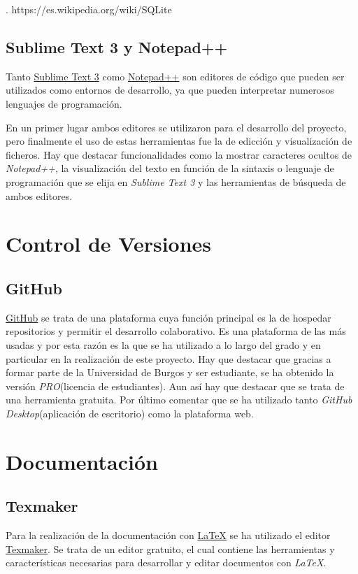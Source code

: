 \cite{sqlite}. https://es.wikipedia.org/wiki/SQLite

\subsection{Sublime Text 3 y Notepad++}\label{sublime_text_3_y_notepad++}
Tanto \href{https://www.sublimetext.com/}{Sublime Text 3} como \href{https://notepad-plus-plus.org/}{Notepad++} son editores de código que pueden ser utilizados como entornos de desarrollo, ya que pueden interpretar numerosos lenguajes de programación. 

En un primer lugar ambos editores se utilizaron para el desarrollo del proyecto, pero finalmente el uso de estas herramientas fue la de edicción y visualización de ficheros. Hay que destacar funcionalidades como la mostrar caracteres ocultos de \emph{Notepad++}, la visualización del texto en función de la sintaxis o lenguaje de programación que se elija en \emph{Sublime Text 3} y las herramientas de búsqueda de ambos editores.


\section{Control de Versiones}\label{control_de_versiones}
\subsection{GitHub}\label{gitHub}
\href{https://github.com/}{GitHub} se trata de una plataforma cuya función principal es la de hospedar repositorios y permitir el desarrollo colaborativo.
Es una plataforma de las más usadas y por esta razón es la que se ha utilizado a lo largo del grado y en particular en la realización de este proyecto. Hay que destacar que gracias a formar parte de la Universidad de Burgos y ser estudiante, se ha obtenido la versión \emph{PRO}(licencia de estudiantes). Aun así hay que destacar que se trata de una herramienta gratuita.
Por último comentar que se ha utilizado tanto \emph{GitHub Desktop}(aplicación de escritorio) como la plataforma web.

\cite{github}


\section{Documentación}\label{documentacion}

\subsection{Texmaker}\label{texmaker}
Para la realización de la documentación con \href{https://www.latex-project.org/}{LaTeX} se ha utilizado el editor \href{https://www.xm1math.net/texmaker/}{Texmaker}. Se trata de un editor gratuito, el cual contiene las herramientas y características necesarias para desarrollar y editar documentos con \emph{LaTeX}.

